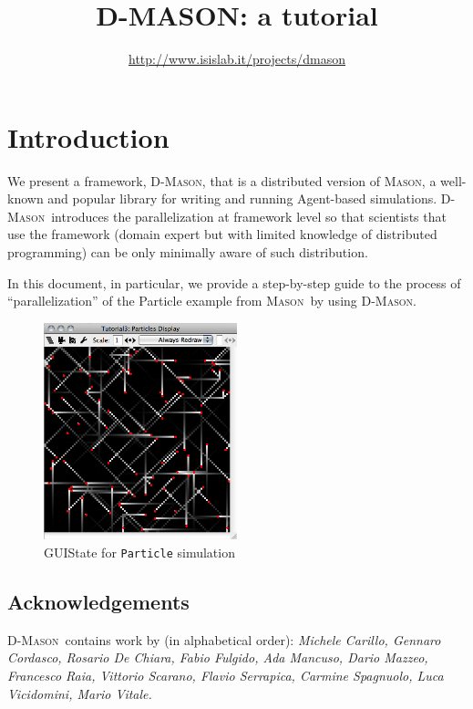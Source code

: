 \documentclass{book}
\begin{document}
\pagestyle{empty}
\sffamily
\title{D-MASON: a tutorial}
\author{\url{http://www.isislab.it/projects/dmason}}
\maketitle

\pagestyle{fancy}
\fancyhf{}
\lhead[]{\thepage}
\rhead[\thepage]{}



\def\ma{\textsc{Mason}}
\def\dm{\textsc{D-Mason}}

\chapter{Introduction}
We present a framework, \dm, that is a distributed version of  \ma, a well-known and popular library for writing and running Agent-based simulations. \dm\ introduces the parallelization at framework level so that scientists that use the framework (domain expert but with limited knowledge of distributed programming) can be only minimally aware of such distribution. 

In this document, in particular, we provide a step-by-step guide to the process of ``parallelization'' of the Particle example from \ma\ by using \dm.
\begin{figure}[ht]
	\centering
		\includegraphics[width=0.5\textwidth, bb=0 0 470 520]{particles.png}	
		\caption{GUIState for \texttt{Particle} simulation}
	\label{fig:p01}
\end{figure}

\section*{Acknowledgements}
\dm\ contains work by (in alphabetical order): \textit{Michele Carillo, Gennaro Cordasco, Rosario De Chiara, Fabio Fulgido, Ada Mancuso, Dario Mazzeo, Francesco Raia, Vittorio Scarano, Flavio Serrapica, Carmine Spagnuolo, 
Luca Vicidomini, Mario Vitale.}
\end{document}
